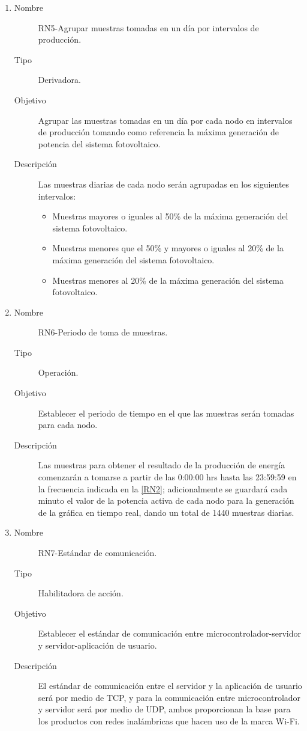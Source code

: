 \begin{enumerate}[label=RN\arabic*.]
\item \label{RN5}
		\begin{description}
			\item[Nombre] RN5-Agrupar muestras tomadas en un día por intervalos de producción.
			\item[Tipo] Derivadora.
			\item[Objetivo] Agrupar las muestras tomadas en un día por cada nodo en intervalos de producción tomando como referencia la máxima generación de potencia del sistema fotovoltaico. 
			\item[Descripción] Las muestras diarias de cada nodo serán agrupadas en los siguientes intervalos:
			\begin{itemize}
				\item Muestras mayores o iguales al 50\% de la máxima generación del sistema fotovoltaico.  
				\item Muestras menores que el 50\% y mayores o iguales al 20\% de la máxima generación del sistema fotovoltaico. 
				\item Muestras menores al 20\% de la máxima generación del sistema fotovoltaico. 
			\end{itemize}
		\end{description}

\item \label{RN6}
		\begin{description}
			\item[Nombre] RN6-Periodo de toma de muestras.
			\item[Tipo] Operación.
			\item[Objetivo] Establecer el periodo de tiempo en el que las muestras serán tomadas para cada nodo.
			\item[Descripción] Las muestras para obtener el resultado de la producción de energía comenzarán a tomarse a partir de las 0:00:00 hrs hasta las 23:59:59 en la frecuencia indicada en la \ref{RN2}; adicionalmente se guardará cada minuto el valor de la potencia activa de cada nodo para la generación de la gráfica en tiempo real, dando un total de 1440 muestras diarias.		
		\end{description}
		
\item \label{RN7}
		\begin{description}
			\item[Nombre] RN7-Estándar de comunicación.
			\item[Tipo] Habilitadora de acción.
			\item[Objetivo] Establecer el estándar de comunicación entre microcontrolador-servidor y servidor-aplicación de usuario.
			\item[Descripción] El estándar de comunicación entre el servidor y la aplicación de usuario será por medio de TCP, y para la comunicación entre microcontrolador y servidor será por medio de UDP, ambos proporcionan la base para los productos con redes inalámbricas que hacen uso de la marca Wi-Fi.
		\end{description}
		

\end{enumerate}
